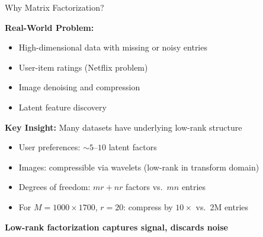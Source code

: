 \documentclass[aspectratio=169,usenames,dvipsnames]{beamer}
\begin{document}
\begin{frame}{Why Matrix Factorization?}

\textbf{Real-World Problem:}
\begin{itemize}
  \item High-dimensional data with missing or noisy entries
  \item User-item ratings (Netflix problem)
  \item Image denoising and compression
  \item Latent feature discovery
\end{itemize}

\vspace{0.5cm}

\textbf{Key Insight:} Many datasets have underlying low-rank structure
\begin{itemize}
  \item User preferences: $\sim 5$--$10$ latent factors
  \item Images: compressible via wavelets (low-rank in transform domain)
  \item Degrees of freedom: $mr + nr$ factors vs.\ $mn$ entries
  \item For $M = 1000 \times 1700$, $r=20$: compress by $10\times$ vs.\ 2M entries
\end{itemize}

\vspace{0.5cm}

\textbf{Low-rank factorization captures signal, discards noise}

\end{frame}
\end{document}
